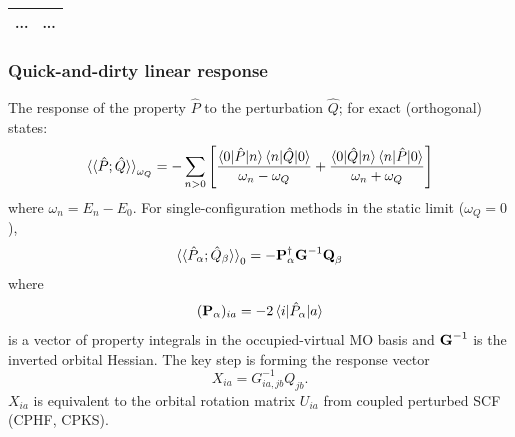 \documentclass{beamer}
\begin{document}
\begin{frame}
\begin{tabulary}{1.00\textwidth}{rL}
    ... & ... \\
    \bottomrule
  \end{tabulary}
\end{frame}

\begin{frame}
  \frametitle{Quick-and-dirty linear response}
  The response of the property \(\hat{P}\) to the perturbation \(\hat{Q}\); for exact (orthogonal) states:
  \begin{equation*}
    \braket{\braket{\hat{P};\hat{Q}}}_{\omega_{Q}} = - \sum_{n>0} \left[ \frac{\braket{0|\hat{P}|n}\braket{n|\hat{Q}|0}}{\omega_{n} - \omega_{Q}} + \frac{\braket{0|\hat{Q}|n}\braket{n|\hat{P}|0}}{\omega_{n} + \omega_{Q}} \right]
  \end{equation*}
  where \(\omega_{n} = E_{n} - E_{0}\). For single-configuration methods in the static limit (\(\omega_{Q} = 0\)),
  \begin{equation*}
    \braket{\braket{\hat{P}_{\alpha};\hat{Q}_{\beta}}}_{0} = - \boldsymbol{\mathbf{P}}_{\alpha}^{\dagger} \boldsymbol{\mathbf{G}}^{-1} \boldsymbol{\mathbf{Q}}_{\beta}
  \end{equation*}
  where
  \begin{equation*}
    (\boldsymbol{\mathbf{P}}_{\alpha})_{ia} = -2 \braket{ i | \hat{P}_{\alpha} | a }
  \end{equation*}
  is a vector of property integrals in the occupied-virtual MO basis and \(\boldsymbol{\mathbf{G}}^{-1}\) is the inverted orbital Hessian. The key step is forming the response vector
  \begin{equation*}
    X_{ia} = G_{ia,jb}^{-1} Q_{jb}.
  \end{equation*}
  \(X_{ia}\) is equivalent to the orbital rotation matrix \(U_{ia}\) from coupled perturbed SCF (CPHF, CPKS).
\end{frame}
\end{document}
